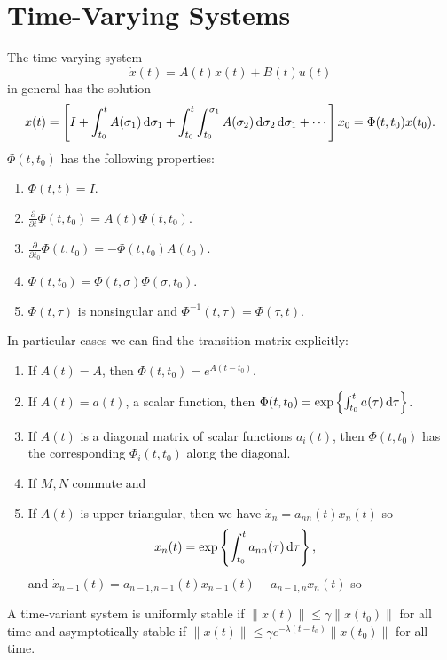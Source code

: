 \documentclass{report}
\begin{document}
\section{Time-Varying Systems}
The time varying system
$$
\dot{x}(t) = A(t) x(t) + B(t) u(t)
$$
in general has the solution
$$
x(t) =
\left[
  I
+ \int_{t_0}^{t} A(\sigma_1) \dif\sigma_1
+ \int_{t_0}^t \int_{t_0}^{\sigma_1} A(\sigma_2) \dif\sigma_2
\dif\sigma_1
+ \cdots
\right]
x_0 =
\Phi(t, t_0) x(t_0).
$$
$\Phi(t, t_0)$ has the following properties:
\begin{enumerate}
  \item{
    $\Phi(t, t) = I$.
  }
  \item{
    $\frac{\partial}{\partial t} \Phi(t, t_0) = A(t) \Phi(t, t_0)$.
  }
  \item{
    $\frac{\partial}{\partial t_0} \Phi(t, t_0) = -\Phi(t, t_0) A(t_0)$.
  }
  \item{
    $\Phi(t, t_0) = \Phi(t, \sigma) \Phi(\sigma, t_0)$.
  }
  \item{
    $\Phi(t, \tau)$ is nonsingular and
    $\Phi^{-1}(t, \tau) = \Phi(\tau, t)$.
  }
\end{enumerate}
In particular cases we can find the transition matrix explicitly:
\begin{enumerate}
  \item{
    If $A(t) = A$, then $\Phi(t, t_0) = e^{A(t - t_0)}$.
  }
  \item{
    If $A(t) = a(t)$, a scalar function, then
    $\Phi(t, t_0) = \exp\left\{\int_{t_0}^{t} a(\tau) \dif \tau\right\}$.
  }
  \item{
    If $A(t)$ is a diagonal matrix of scalar functions $a_i(t)$, then
    $\Phi(t,t_0)$ has the corresponding $\Phi_i(t, t_0)$ along the diagonal.
  }
  \item{
    If $M, N$ commute and
  }
  \item{
    If $A(t)$ is upper triangular, then we have
    $\dot{x}_n = a_{nn}(t) x_n(t)$ so
    \begin{align*}
      x_n(t) &=
        \exp\left\{\int_{t_0}^t a_{nn}(\tau) \dif\tau\right\},
    \end{align*}
    and
    $\dot{x}_{n-1}(t) = a_{n-1,n-1}(t)x_{n-1}(t) +  a_{n-1,n}x_n(t)$
    so
    $$

    $$
  }
\end{enumerate}

A time-variant system is uniformly stable if
$\| x(t) \| \leq \gamma \| x(t_0) \|$ for all time and asymptotically
stable if
$\| x(t) \| \leq \gamma e^{-\lambda(t - t_0)} \| x(t_0) \|$ for all time.
\end{document}
